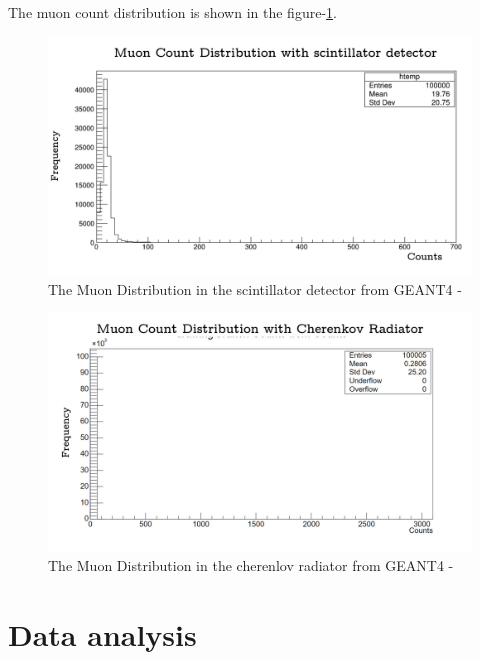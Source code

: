 \documentclass{article}
\begin{document}
\begin{multicols}{2}
The muon count distribution is shown in the figure-\ref{sim_scint_plot}.
\begin{figure}[H]
    \centering
    \includegraphics[width = \columnwidth]{Images/scint_muon_dist.png}
    \caption{The Muon Distribution in the scintillator detector from GEANT4 -\cite{agostinelli2003geant4}}
    \label{sim_scint_plot}
\end{figure}


\begin{figure}[H]
    \centering
    \includegraphics[width = \columnwidth]{Images/cher_muon_dist.png}
    \caption{The Muon Distribution in the cherenlov radiator from GEANT4 -\cite{agostinelli2003geant4}}
    \label{sim_cher_plot}
\end{figure}



\section{\label{dataanalysis}Data analysis}



\end{multicols}
\end{document}
